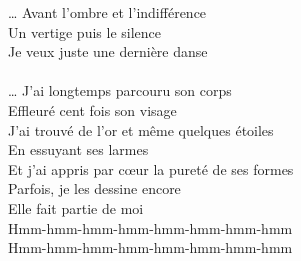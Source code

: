 … Avant l'ombre et l'indifférence\\
Un vertige puis le silence\\
Je veux juste une dernière danse\\\\
… J'ai longtemps parcouru son corps\\
Effleuré cent fois son visage\\
J'ai trouvé de l'or et même quelques étoiles\\
En essuyant ses larmes\\
Et j'ai appris par cœur la pureté de ses formes\\
Parfois, je les dessine encore\\
Elle fait partie de moi\\
Hmm-hmm-hmm-hmm-hmm-hmm-hmm-hmm\\
Hmm-hmm-hmm-hmm-hmm-hmm-hmm-hmm